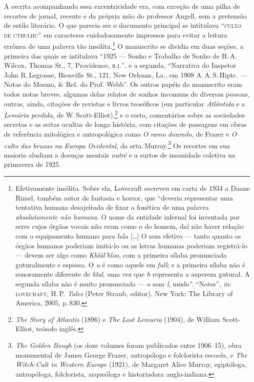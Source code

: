 A escrita acompanhando essa excentricidade era, com exceção de uma pilha
de recortes de jornal, recente e da própria mão do professor Angell, sem
a pretensão de estilo literário. O que parecia ser o documento principal
se intitulava ``\textsc{culto de cthulhu}'' em caracteres cuidadosamente
impressos para evitar a leitura errônea de uma palavra tão
insólita.\footnote{Efetivamente insólita. Sobre ela, Lovecraft escreveu
  em carta de 1934 a Duane Rimel, também autor de fantasia e horror, que
  ``deveria representar uma tentativa humana desajeitada de fixar a
  fonética de uma palavra \emph{absolutamente não humana}. O nome da
  entidade infernal foi inventada por seres cujos órgãos vocais não eram
  como o do homem, daí não haver relação com o equipamento humano para
  fala [\ldots{}] O som efetivo --- tanto quanto os órgãos humanos poderiam
  imitá-lo ou as letras humanas poderiam registrá-lo --- devem ser algo
  como \emph{Khlûl'hloo}, com a primeira sílaba pronunciada guturalmente
  e espessa. O \emph{u} é como aquele em \emph{full}; e a primeira
  sílaba não é sonoramente diferente de \emph{klul}, uma vez que
  \emph{h} representa a aspereza gutural. A segunda sílaba não é muito
  pronunciada --- o som \emph{l}, mudo''. ``Notes'', \emph{in}:
 \textsc{lovecraft}, H.\,P. \emph{Tales} (Peter Straub, editor). New
  York: The Library of America, 2005, p.\,830.} O manuscrito se dividia em duas
seções, a primeira das quais se intitulava ``1925 --- Sonho e Trabalho
de Sonho de H.\,A. Wilcox, Thomas St., 7, Providence, \textsc{r.i.}'', e a
segunda, ``Narrativa do Inspetor John R.\,Legrasse, Bienville St., 121,
New Orleans, La., em 1908 A.\,A.\,S.\,Hiptc. --- Notas do Mesmo, \& Rel. do
Prof. Webb''. Os outros papéis do manuscrito eram todos notas breves,
algumas delas relatos de sonhos incomuns de diversas pessoas, outras,
ainda, citações de revistas e livros teosóficos (em particular
\emph{Atlântida} e a \emph{Lemúria perdida}, de W.\,Scott-Elliot),\footnote{\emph{The
  Story of Atlantis} (1896) e \emph{The Lost Lemuria} (1904), de William
  Scott-Elliot, teósofo inglês.} e o resto, comentários
sobre as sociedades secretas e as seitas ocultas de longa história, com
citações de passagens em obras de referência mitológica e antropológica
como \emph{O ramo dourado}, de Frazer e \emph{O culto das bruxas na
Europa Ocidental}, da srta.\,Murray.\footnote{\emph{The Golden Bough} (os
  doze volumes foram publicados entre 1906--15), obra monumental de James
  George Frazer, antropólogo e folclorista escocês, e
  \emph{The Witch-Cult in Western Europe} (1921), de Margaret Alice
  Murray, egiptóloga, antropóloga, folclorista, arqueóloga e
  historiadora anglo-indiana.} Os recortes em sua maioria aludiam a
doenças mentais \emph{outré} e a surtos de insanidade coletiva na
primavera de 1925.

